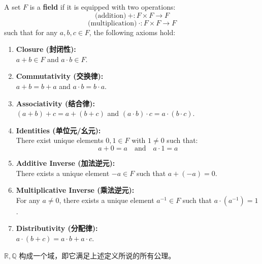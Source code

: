 \documentclass[
	UTF-8,
	11pt, %
	a4paper, %
]{LegrandOrangeBook}
\begin{document}
    \begin{definition}[Field / 域]
    A set $F$ is a \textbf{field} if it is equipped with two 
    operations:
    $$\text{(addition)}\ + : F\times F \to F$$
    $$\text{(multiplication)}\ \cdot : F \times F \to F $$
    such that for any $a, b, c \in F$, the following axioms hold:

    \begin{enumerate}
        \item \textbf{Closure (封闭性):} \\
        $a + b \in F$ and $a \cdot b \in F$.
        
        \item \textbf{Commutativity (交换律):} \\
        $a + b = b + a$ and $a \cdot b = b \cdot a$.
        
        \item \textbf{Associativity (结合律):} \\
        $(a + b) + c = a + (b + c)$ and $(a \cdot b) \cdot c = a \cdot (b \cdot c)$.
        
        \item \textbf{Identities (单位元/幺元):} \\
        There exist unique elements $0, 1 \in F$ with $1 \neq 0$ such that:
        \[ a + 0 = a \quad \text{and} \quad a \cdot 1 = a \]
        
        \item \textbf{Additive Inverse (加法逆元):} \\
        There exists a unique element $-a \in F$ such that $a + (-a) = 0$.
        
        \item \textbf{Multiplicative Inverse (乘法逆元):} \\
        For any $a \neq 0$, there exists a unique element $a^{-1} \in F$ such that $a \cdot (a^{-1}) = 1$.
        
        \item \textbf{Distributivity (分配律):} \\
        $a \cdot (b + c) = a \cdot b + a \cdot c$.
    \end{enumerate}
    \end{definition}

    \begin{remark}
        $\mathbb{R}, \mathbb{Q}$ 构成一个域，即它满足上述定义所说的所有公理。
    \end{remark}

    \newpage
\end{document}
